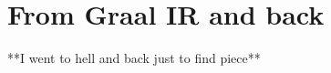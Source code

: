\chapter{From Graal IR and back}\label{chap:conversion}

**I went to hell and back just to find piece**